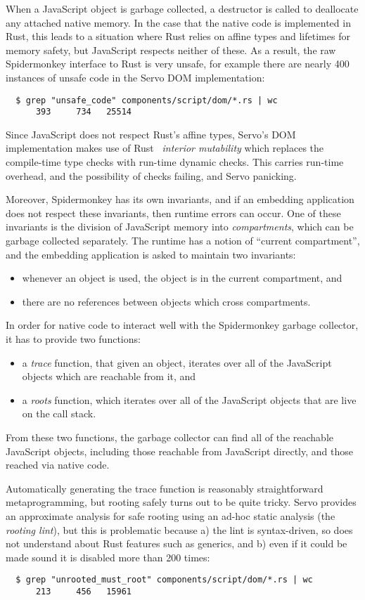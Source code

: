 When a JavaScript object is garbage collected, a destructor is called to
deallocate any attached native memory. In the case that the native code
is implemented in Rust, this leads to a situation where Rust relies on affine
types and lifetimes for memory safety, but JavaScript respects neither of these.
As a result, the raw Spidermonkey interface to Rust is very unsafe,
for example there are nearly 400 instances of unsafe code in the Servo
DOM implementation:
\begin{verbatim}
  $ grep "unsafe_code" components/script/dom/*.rs | wc
      393     734   25514
\end{verbatim}
Since JavaScript does not respect Rust's affine types,
Servo's DOM implementation makes use of Rust~\cite[\S3.11]{rust}
\emph{interior mutability} which replaces the compile-time type
checks with run-time dynamic checks. This carries run-time overhead,
and the possibility of checks failing, and Servo panicking.

Moreover, Spidermonkey has its own invariants, and if an embedding
application does not respect these invariants, then runtime errors can
occur. One of these invariants is the division of JavaScript memory
into \emph{compartments}, which can be garbage collected
separately. The runtime has a notion of ``current compartment'',
and the embedding application is asked to maintain two invariants:
\begin{itemize}
  \item whenever an object is used, the object is in the current compartment, and
  \item there are no references between objects which cross compartments.
\end{itemize}
In order for native code to interact well with the Spidermonkey garbage collector,
it has to provide two functions:
\begin{itemize}
\item a \emph{trace} function, that given an object, iterates over all of the
  JavaScript objects which are reachable from it, and
\item a \emph{roots} function, which iterates over all of the JavaScript
  objects that are live on the call stack.
\end{itemize}
From these two functions, the garbage collector can find all of the reachable
JavaScript objects, including those reachable from JavaScript directly, and
those reached via native code.

Automatically generating the trace function is reasonably straightforward
metaprogramming, but rooting safely turns out to be quite tricky.
Servo provides an approximate analysis for safe rooting using an ad-hoc
static analysis (the \emph{rooting lint}), but this is problematic because
a) the lint is syntax-driven, so does not understand about Rust features
such as generics, and b) even if it could be made sound it is disabled
more than 200 times:
\begin{verbatim}
  $ grep "unrooted_must_root" components/script/dom/*.rs | wc
      213     456   15961
\end{verbatim}

